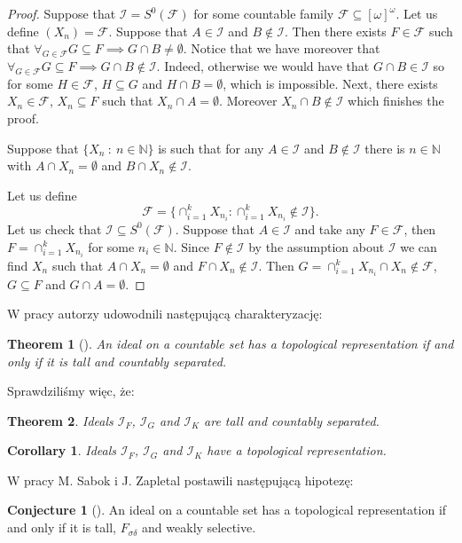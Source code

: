 \documentclass{amsart}
\newtheorem{thm}{Theorem}
\newtheorem{cor}{Corollary}
\theoremstyle{definition}
\theoremstyle{definition}
\newtheorem{conj}{Conjecture}
\newcommand{\N}{{\mathbb N}}
\newcommand{\I}{\mathcal I}
\newcommand{\calF}{\mathcal{F}}
\newcommand{\MB}{S^0}  %
\begin{document}
\begin{proof}
Suppose that $\I = \MB(\calF)$ for some countable
family $\calF \subseteq [\omega]^\omega$.
Let us define $(X_n) = \calF$. Suppose that $A \in \I$
and $B \not\in \I$. Then there exists $F \in \calF$
such that $\forall_{G\in\calF} G \subseteq F \implies G \cap B \not= \emptyset$.
Notice that we have moreover that $\forall_{G\in\calF} G \subseteq F \implies G \cap B \not\in\I$.
Indeed, otherwise we would have that $G\cap B \in \I$ so
for some $H\in\calF$, $H\subseteq G$ and $H\cap B = \emptyset$,
which is impossible. 
Next, there exists $X_n \in \calF$, $X_n \subseteq F$ such 
that $X_n \cap A = \emptyset$. Moreover
$X_n \cap B\not \in \I$ which finishes the proof.

Suppose that
$\{X_n\ :\ n\in\N\}$ is such that for any $A\in \I$ and $B\notin \I$ 
there is $n\in\N$ with $A\cap X_n=\emptyset$ and $B\cap X_n\notin \I$. 

Let us define
\[
\calF = \{
  \cap_{i=1}^k X_{n_i}\colon \cap_{i=1}^k X_{n_i} \not\in \I
	\}.
\]	   
Let us check that $\I \subseteq \MB(\calF)$.
Suppose that $A\in\I$ and
take any $F\in\calF$, then 
$F = \cap_{i=1}^k X_{n_i}$ for some $n_i\in\N$.
Since $F\not\in\I$ by the assumption about $\I$
we can find $X_n$ such that $A\cap X_n=\emptyset$ and $F\cap X_n\not\in \I$. 
Then $G = \cap_{i=1}^k X_{n_i} \cap X_n\not\in\calF$,
$G\subseteq F$ and $G \cap A = \emptyset$.
\end{proof}

		\color{purple}


W pracy \cite{Adas} autorzy udowodnili następującą charakteryzację:
\begin{thm}[\cite{Adas}]
An ideal on a countable set has a topological representation if and only if it is tall and countably separated.
\end{thm}

Sprawdziliśmy więc, że:
\begin{thm}
Ideals $\I_F$, $\I_G$ and $\I_K$ are tall and countably separated.
\end{thm}

\begin{cor}
Ideals $\I_F$, $\I_G$ and $\I_K$ have a topological representation.
\end{cor}

W pracy \cite{Sabok} M. Sabok i J. Zapletal postawili następującą hipotezę:
\begin{conj}[\cite{Sabok}]
An ideal on a countable set has a topological representation if and only if it is tall, $F_{\sigma\delta}$ and weakly selective. 
\end{conj}
\end{document}

